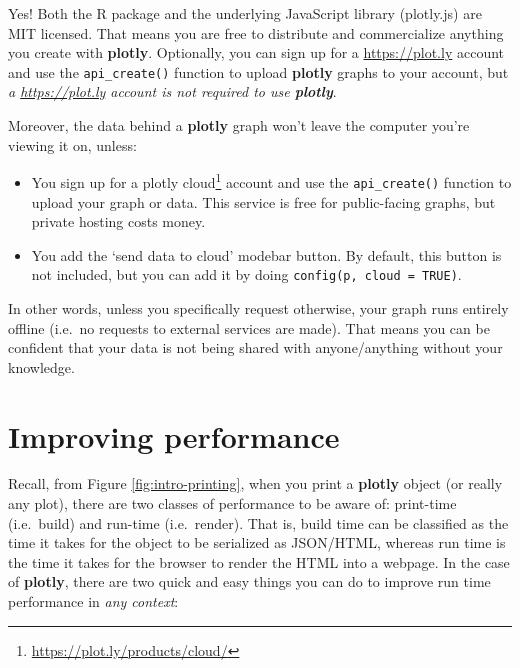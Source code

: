 \documentclass[
  12pt,
]{krantz}
\makeatletter
\providecommand{\tightlist}{%
  \setlength{\itemsep}{0pt}\setlength{\parskip}{0pt}}
\renewcommand{\href}[2]{#2\footnote{\url{#1}}}
\newcommand{\indexc}[1]{\index{#1@\texttt{#1}}}
\makeatother
\begin{document}
Yes! Both the R package and the underlying JavaScript library (plotly.js) are MIT licensed. That means you are free to distribute and commercialize anything you create with \textbf{plotly}. Optionally, you can sign up for a \url{https://plot.ly} account and use the \texttt{api\_create()} function to upload \textbf{plotly} graphs to your account, but \emph{a \url{https://plot.ly} account is not required to use \textbf{plotly}}.

Moreover, the data behind a \textbf{plotly} graph won't leave the computer you're viewing it on, unless:

\begin{itemize}
\tightlist
\item
  You sign up for a \href{https://plot.ly/products/cloud/}{plotly cloud} account and use the \texttt{api\_create()} function to upload your graph or data. This service is free for public-facing graphs, but private hosting costs money.
\item
  You add the `send data to cloud' modebar button. By default, this button is not included, but you can add it by doing \texttt{config(p,\ cloud\ =\ TRUE)}.
\end{itemize}

In other words, unless you specifically request otherwise, your graph runs entirely offline (i.e.~no requests to external services are made). That means you can be confident that your data is not being shared with anyone/anything without your knowledge.

\hypertarget{performance}{%
\chapter{Improving performance}\label{performance}}

\indexc{partial\_bundle()}

Recall, from Figure \ref{fig:intro-printing}, when you print a \textbf{plotly} object (or really any plot), there are two classes of performance to be aware of: print-time (i.e.~build) and run-time (i.e.~render). That is, build time can be classified as the time it takes for the object to be serialized as JSON/HTML, whereas run time is the time it takes for the browser to render the HTML into a webpage. In the case of \textbf{plotly}, there are two quick and easy things you can do to improve run time performance in \emph{any context}:
\end{document}

